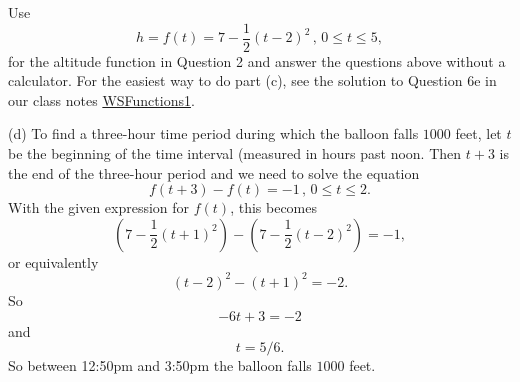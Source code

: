\documentclass{ximera}
\begin{document}
\begin{question} \label{Qf3r3feef}
Use 
\[
 h = f(t) = 7 - \frac{1}{2}\left( t- 2\right)^2 \, , \, 0\leq t \leq 5 ,
\]
for the altitude function in Question 2 and answer the questions above without a calculator. For the easiest way to do part (c), see the solution to Question 6e in our class notes \href{https://ximera.osu.edu/precalc1/PreCalculus1/WSFunctions1/WSFunctions1}{WSFunctions1}. 

\begin{explanation}
(d) To find a three-hour time period during which the balloon falls $1000$ feet, let $t$ be the beginning of the time interval (measured in hours past noon. Then $t+3$ is the end of the three-hour period and we need to solve the equation 
\[
       f(t+3) - f(t) = -1 \, , \, 0\leq t \leq 2 .
\]
With the given expression for $f(t)$, this becomes
\[
  \left(7 - \frac{1}{2}\left( t+1\right)^2\right) - \left( 7 - \frac{1}{2}\left( t- 2\right)^2 \right) = -1 ,
\]
or equivalently
\[
 \left( t-2\right)^2 -  \left( t+1\right)^2 = -2. 
\]
So
\[
    -6t + 3 = -2
\]
and 
\[
 t = 5/6. 
\]
So between 12:50pm and 3:50pm the balloon falls $1000$ feet.

\end{explanation}
\end{question}
\end{document}
